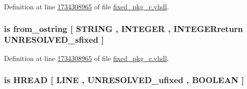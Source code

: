 Definition at line \hyperlink{fixed__pkg__c_8vhdl_source_l1734308965}{1734308965} of file \hyperlink{fixed__pkg__c_8vhdl_source}{fixed\+\_\+pkg\+\_\+c.\+vhdl}.

\hypertarget{classfixed__pkg_a77ae4ce46a979e96c632a390accfe9f8}{}
\subsubsection[{from\+\_\+octal\+\_\+string}]{ {\bfseries \textcolor{keywordflow}{is}\textcolor{vhdlchar}{ }\textcolor{vhdlchar}{from\+\_\+ostring}\textcolor{vhdlchar}{ }\textcolor{vhdlchar}{\mbox{[}}\textcolor{vhdlchar}{ }\textcolor{comment}{S\+T\+R\+I\+N\+G}\textcolor{vhdlchar}{ }\textcolor{vhdlchar}{,}\textcolor{vhdlchar}{ }\textcolor{comment}{I\+N\+T\+E\+G\+E\+R}\textcolor{vhdlchar}{ }\textcolor{vhdlchar}{,}\textcolor{vhdlchar}{ }\textcolor{vhdlchar}{I\+N\+T\+E\+G\+E\+Rreturn}\textcolor{vhdlchar}{ }{\bfseries {\bf U\+N\+R\+E\+S\+O\+L\+V\+E\+D\+\_\+sfixed}} \textcolor{vhdlchar}{ }\textcolor{vhdlchar}{\mbox{]}}\textcolor{vhdlchar}{ }} \hspace{0.3cm}{\ttfamily [Alias]}}\label{classfixed__pkg_a77ae4ce46a979e96c632a390accfe9f8}


Definition at line \hyperlink{fixed__pkg__c_8vhdl_source_l1734308965}{1734308965} of file \hyperlink{fixed__pkg__c_8vhdl_source}{fixed\+\_\+pkg\+\_\+c.\+vhdl}.

\hypertarget{classfixed__pkg_a912490cbabb862a76a9769b0a04e9b48}{}
\subsubsection[{H\+E\+X\+\_\+\+R\+E\+A\+D}]{ {\bfseries \textcolor{keywordflow}{is}\textcolor{vhdlchar}{ }\textcolor{vhdlchar}{H\+R\+E\+A\+D}\textcolor{vhdlchar}{ }\textcolor{vhdlchar}{\mbox{[}}\textcolor{vhdlchar}{ }\textcolor{vhdlchar}{L\+I\+N\+E}\textcolor{vhdlchar}{ }\textcolor{vhdlchar}{,}\textcolor{vhdlchar}{ }{\bfseries {\bf U\+N\+R\+E\+S\+O\+L\+V\+E\+D\+\_\+ufixed}} \textcolor{vhdlchar}{ }\textcolor{vhdlchar}{,}\textcolor{vhdlchar}{ }\textcolor{comment}{B\+O\+O\+L\+E\+A\+N}\textcolor{vhdlchar}{ }\textcolor{vhdlchar}{\mbox{]}}\textcolor{vhdlchar}{ }} \hspace{0.3cm}{\ttfamily [Alias]}}\label{classfixed__pkg_a912490cbabb862a76a9769b0a04e9b48}


